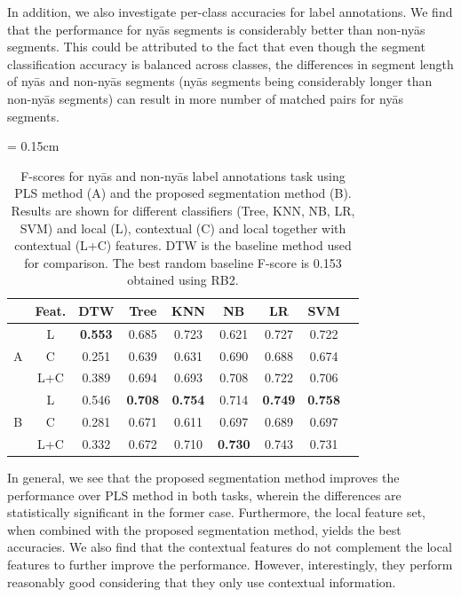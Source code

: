 In addition, we also investigate per-class accuracies for label annotations. We find that the performance for ny\={a}s segments is considerably better than non-ny\={a}s segments. This could be attributed to the fact that even though the segment classification accuracy is balanced across classes, the differences in segment length of ny\={a}s and non-ny\={a}s segments (ny\={a}s segments being considerably longer than non-ny\={a}s segments) can result in more number of matched pairs for ny\={a}s segments.

\begin{table} 
	\centering
	\tabcolsep = 0.15cm
	\renewcommand{\arraystretch}{1.15}
	\begin{tabular}{ c|c|c | c  c  c  c  c  c }
		\hline\hline
		& Feat.	&	DTW & Tree	 &	KNN 	&	NB		& LR 	&	SVM	\\
		\hline
		
		\multirow{3}{*}{A} &   L		& \textbf{0.553} & 0.685 & 0.723 & 0.621 & 0.727 & 0.722	\\
		&	C   		& 0.251 & 0.639 & 0.631  & 0.690 & 0.688 & 0.674	\\
		& 	L+C		& 0.389 & 0.694 & 0.693 & 0.708 & 0.722 & 0.706	\\	
		\hline
		\multirow{3}{*}{B} & 	L		& 0.546 & \textbf{0.708} & \textbf{0.754} & 0.714 & \textbf{0.749} & \textbf{0.758} \\
		& 	C		&0.281 & 0.671 & 0.611 & 0.697 & 0.689 & 0.697\\
		& 	L+C		& 0.332 & 0.672 & 0.710 & \textbf{0.730} & 0.743 & 0.731\\
		\hline\hline        
	\end{tabular}
	\caption{F-scores for ny\={a}s and non-ny\={a}s label annotations task using PLS method (A) and the proposed segmentation method (B). Results are shown for different classifiers (Tree, KNN, NB, LR, SVM) and local (L), contextual (C) and local together with contextual (L+C) features. DTW is the baseline method used for comparison. The best random baseline F-score is  0.153 obtained using RB2. } 
	\label{tab:accuraciesRegion}
\end{table}


In general, we see that the proposed segmentation method improves the performance over PLS method in both tasks, wherein the differences are statistically significant in the former case. Furthermore, the local feature set, when combined with the proposed segmentation method, yields the best accuracies. We also find that the contextual features do not complement the local features to further improve the performance. However, interestingly, they perform reasonably good considering that they only use contextual information.


